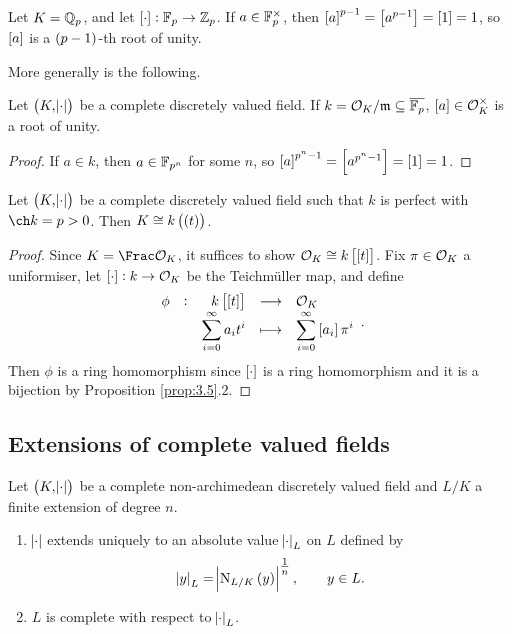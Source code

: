 \begin{example}
Let $ K = \mathbb{Q}_p $, and let $ \sbr{\cdot} : \FF_p \to \ZZ_p $. If $ a \in \mathbb{F}_p^\times $, then $ \sbr{a}^{p - 1} = \sbr{a^{p - 1}} = \sbr{1} = 1 $, so $ \sbr{a} $ is a $ \br{p - 1} $-th root of unity.
\end{example}

More generally is the following.

\begin{lemma}
Let $ \br{K, \abs{\cdot}} $ be a complete discretely valued field. If $ k = \mathcal{O}_K / \mathfrak{m} \subseteq \overline{\mathbb{F}_p} $, $ \sbr{a} \in \OOO_K^\times $ is a root of unity.
\end{lemma}

\begin{proof}
If $ a \in k $, then $ a \in \mathbb{F}_{p^n} $ for some $ n $, so $ \sbr{a}^{p^n - 1} = \sbr{a^{p^n - 1}} = \sbr{1} = 1 $.
\end{proof}

\begin{theorem}
\label{thm:5.7}
Let $ \br{K, \abs{\cdot}} $ be a complete discretely valued field such that $ k $ is perfect with $ \ch k = p > 0 $. Then $ K \cong k\br{\br{t}} $.
\end{theorem}

\begin{proof}
Since $ K = \Frac \OOO_K $, it suffices to show $ \OOO_K \cong k\sbr{\sbr{t}} $. Fix $ \pi \in \mathcal{O}_K $ a uniformiser, let $ \sbr{\cdot} : k \to \OOO_K $ be the Teichm\"uller map, and define
$$ \function[\phi]{k\sbr{\sbr{t}}}{\OOO_K}{\displaystyle\sum_{i = 0}^\infty a_it^i}{\displaystyle\sum_{i = 0}^\infty \sbr{a_i}\pi^i}. $$
Then $ \phi $ is a ring homomorphism since $ \sbr{\cdot} $ is a ring homomorphism and it is a bijection by Proposition \ref{prop:3.5}.$ 2 $.
\end{proof}

\subsection{Extensions of complete valued fields}


\begin{theorem}
\label{thm:6.1}
Let $ \br{K, \abs{\cdot}} $ be a complete non-archimedean discretely valued field and $ L / K $ a finite extension of degree $ n $.
\begin{enumerate}
\item $ \abs{\cdot} $ extends uniquely to an absolute value $ \abs{\cdot}_L $ on $ L $ defined by
$$ \abs{y}_L = \abs{\N_{L / K}\br{y}}^{\tfrac{1}{n}}, \qquad y \in L. $$
\item $ L $ is complete with respect to $ \abs{\cdot}_L $.
\end{enumerate}
\end{theorem}


